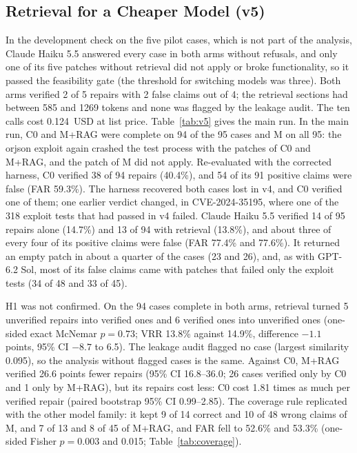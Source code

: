 \documentclass[ai,article,submit,oneauthor]{Definitions/mdpi}
\begin{document}
\subsection{Retrieval for a Cheaper Model (v5)}\label{sec:resv5}

In the development check on the five pilot cases, which is not part of the analysis, Claude Haiku 5.5 answered every case in both arms without refusals, and only one of its five patches without retrieval did not apply or broke functionality, so it passed the feasibility gate (the threshold for switching models was three). Both arms verified 2 of 5 repairs with 2 false claims out of 4; the retrieval sections had between 585 and 1269 tokens and none was flagged by the leakage audit. The ten calls cost 0.124~USD at list price. Table~\ref{tab:v5} gives the main run. In the main run, C0 and M+RAG were complete on 94 of the 95 cases and M on all 95: the orjson exploit again crashed the test process with the patches of C0 and M+RAG, and the patch of M did not apply. Re-evaluated with the corrected harness, C0 verified 38 of 94 repairs (40.4\%), and 54 of its 91 positive claims were false (FAR 59.3\%). The harness recovered both cases lost in v4, and C0 verified one of them; one earlier verdict changed, in CVE-2024-35195, where one of the 318 exploit tests that had passed in v4 failed. Claude Haiku 5.5 verified 14 of 95 repairs alone (14.7\%) and 13 of 94 with retrieval (13.8\%), and about three of every four of its positive claims were false (FAR 77.4\% and 77.6\%). It returned an empty patch in about a quarter of the cases (23 and 26), and, as with GPT-6.2 Sol, most of its false claims came with patches that failed only the exploit tests (34 of 48 and 33 of 45).

H1 was not confirmed. On the 94 cases complete in both arms, retrieval turned 5 unverified repairs into verified ones and 6 verified ones into unverified ones (one-sided exact McNemar $p=0.73$; VRR 13.8\% against 14.9\%, difference $-1.1$ points, 95\% CI $-8.7$ to 6.5). The leakage audit flagged no case (largest similarity 0.095), so the analysis without flagged cases is the same. Against C0, M+RAG verified 26.6 points fewer repairs (95\% CI 16.8--36.0; 26 cases verified only by C0 and 1 only by M+RAG), but its repairs cost less: C0 cost 1.81 times as much per verified repair (paired bootstrap 95\% CI 0.99--2.85). The coverage rule replicated with the other model family: it kept 9 of 14 correct and 10 of 48 wrong claims of M, and 7 of 13 and 8 of 45 of M+RAG, and FAR fell to 52.6\% and 53.3\% (one-sided Fisher $p=0.003$ and 0.015; Table~\ref{tab:coverage}).
\end{document}
